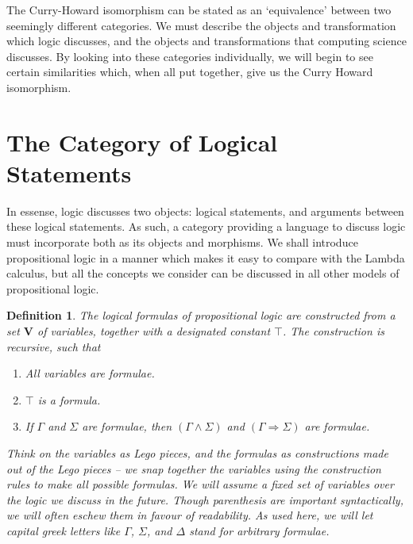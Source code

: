 \documentclass{article}
\theoremstyle{plain}
\newtheorem{definition}{Definition}
\begin{document}
The Curry-Howard isomorphism can be stated as an `equivalence' between two seemingly different categories. We must describe the objects and transformation which logic discusses, and the objects and transformations that computing science discusses. By looking into these categories individually, we will begin to see certain similarities which, when all put together, give us the Curry Howard isomorphism.

\section{The Category of Logical Statements}

In essense, logic discusses two objects: logical statements, and arguments between these logical statements. As such, a category providing a language to discuss logic must incorporate both as its objects and morphisms. We shall introduce propositional logic in a manner which makes it easy to compare with the Lambda calculus, but all the concepts we consider can be discussed in all other models of propositional logic.

\begin{definition}
    The logical formulas of propositional logic are constructed from a set $\mathbf{V}$ of variables, together with a designated constant $\top$. The construction is recursive, such that
    \begin{enumerate}
        \item All variables are formulae.
        \item $\top$ is a formula.
        \item If $\Gamma$ and $\Sigma$ are formulae, then $(\Gamma \wedge \Sigma)$ and $(\Gamma \Rightarrow \Sigma)$ are formulae.
    \end{enumerate}
    Think on the variables as Lego pieces, and the formulas as constructions made out of the Lego pieces -- we snap together the variables using the construction rules to make all possible formulas. We will assume a fixed set of variables over the logic we discuss in the future. Though parenthesis are important syntactically, we will often eschew them in favour of readability. As used here, we will let capital greek letters like $\Gamma$, $\Sigma$, and $\Delta$ stand for arbitrary formulae.
\end{definition}
\end{document}
